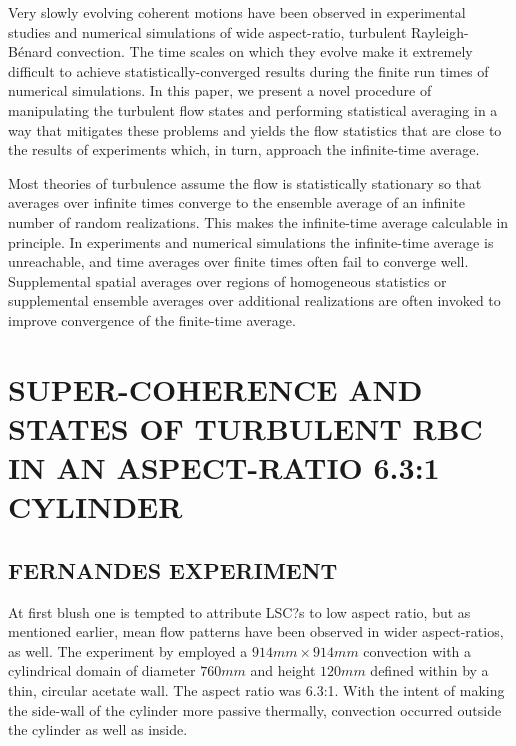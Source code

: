 \documentclass[twocolumn,10pt]{tsfp}
\begin{document}
Very slowly evolving coherent motions have been observed in experimental studies and numerical simulations of wide aspect-ratio, turbulent Rayleigh-B\'{e}nard convection.  The time scales on which they evolve make it extremely difficult to achieve statistically-converged results during the finite run times of numerical simulations. In this paper, we present a novel procedure of manipulating the turbulent flow states and performing statistical averaging in a way that mitigates these problems and yields the flow statistics that are close to the results of experiments which, in turn, approach the infinite-time average.

Most theories of turbulence assume the flow is statistically stationary so that averages over infinite times converge to the ensemble average of an infinite number of random realizations. This makes the infinite-time average calculable in principle. In experiments and numerical simulations the infinite-time average is unreachable, and time averages over finite times often fail to converge well. Supplemental spatial averages over regions of homogeneous statistics or supplemental ensemble averages over additional realizations are often invoked to improve convergence of the finite-time average. 

\section*{SUPER-COHERENCE AND STATES OF TURBULENT RBC IN AN ASPECT-RATIO 6.3:1 CYLINDER}

\subsection*{FERNANDES EXPERIMENT}
At first blush one is tempted to attribute LSC?s to low aspect ratio, but as mentioned earlier, mean flow patterns have been observed in wider aspect-ratios, as well. The experiment by \cite{fernandes2001spatial} employed a $914mm \times  914mm$ convection with a cylindrical domain of diameter $760mm$ and height $120mm$ defined within by a thin, circular acetate wall. The aspect ratio was 6.3:1. With the intent of making the side-wall of the cylinder more passive thermally, convection occurred outside the cylinder as well as inside. 
\end{document}
